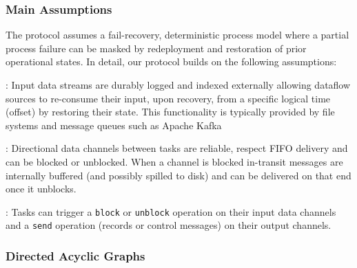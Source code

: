 \subsubsection{Main Assumptions}

The protocol assumes a fail-recovery, deterministic process model \cite{elnozahy2002survey} where a partial process failure can be masked by redeployment and restoration of prior operational states. In detail, our protocol builds on the following assumptions:

: Input data streams are durably logged and indexed externally allowing dataflow sources to re-consume their input, upon recovery, from a specific logical time (offset) by restoring their state. This functionality is typically provided by file systems and message queues such as Apache Kafka \cite{kreps2011kafka}

: Directional data channels between tasks are reliable, respect FIFO delivery and can be blocked or unblocked. When a channel is blocked in-transit messages are internally buffered (and possibly spilled to disk) and can be delivered on that end once it unblocks.

: 
Tasks can trigger a \texttt{block} or \texttt{unblock} operation on their input data channels and a \texttt{send} operation (records or control messages) on their output channels.


\subsubsection{Directed Acyclic Graphs}

